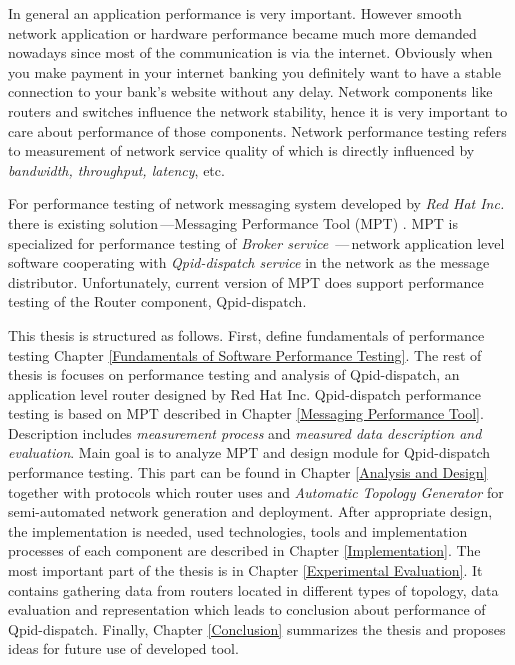 In general an application performance is very important. However smooth network application or hardware performance became much more demanded nowadays since most of the communication is via the internet.  Obviously when you make payment in your internet banking you definitely want to have a stable connection to your bank's website without any delay. Network components like routers and switches influence the network stability, hence it is very important to care about performance of those components. Network performance testing refers to measurement of network service quality of which is directly influenced by \emph{bandwidth, throughput, latency}, etc. 

For performance testing of network messaging system developed by \emph{Red Hat Inc.} there is existing solution\,---Messaging Performance Tool (MPT) \cite{ORPISKE:MSGPT}. MPT is specialized for performance testing of \emph{Broker service} \cite{RH:Broker}\,---\,network application level software cooperating with \emph{Qpid-dispatch service} \cite{RH:Interconnect} in the network as the message distributor. Unfortunately, current version of MPT does support performance testing of the Router component, Qpid-dispatch. 

This thesis is structured as follows. First, define fundamentals of performance testing Chapter \ref{Fundamentals of Software Performance Testing}. The rest of thesis is focuses on performance testing and analysis of Qpid-dispatch, an application level router designed by Red Hat Inc. Qpid-dispatch performance testing is based on MPT described in Chapter \ref{Messaging Performance Tool}. Description includes \emph{measurement process} and \emph{measured data description and evaluation}. Main goal is to analyze MPT and design module for Qpid-dispatch performance testing. This part can be found in Chapter \ref{Analysis and Design} together with protocols which router uses and \emph{Automatic Topology Generator} for semi-automated network generation and deployment. After appropriate design, the implementation is needed, used technologies, tools and  implementation processes of each component are described in Chapter \ref{Implementation}. The most important part of the thesis is in Chapter \ref{Experimental Evaluation}. It contains gathering data from routers located in different types of topology, data evaluation and representation which leads to conclusion about performance of Qpid-dispatch. Finally, Chapter \ref{Conclusion} summarizes the thesis and proposes ideas for future use of developed tool.

